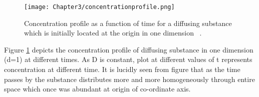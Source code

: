      \begin{figure}[h!]
     \centering
     \texttt{[image: Chapter3/concentrationprofile.png]}
     \caption[Concentration profile as a function of time for a diffusing substance.]{Concentration profile as a function of time for a diffusing substance which is initially located at the origin in one dimension~ \citep{mcquarrie2000}.} 
     \label{fig:concprofile}
     \end{figure}
     
      Figure \ref{fig:concprofile} depicts the concentration profile of diffusing substance in one dimension (d=1) at different times. As D is constant, plot at different values of t represents concentration at different time. It is lucidly seen from figure that as the time passes
      by the substance distributes more and more homogeneously through entire space which
      once was abundant at origin of co-ordinate axis.
      
